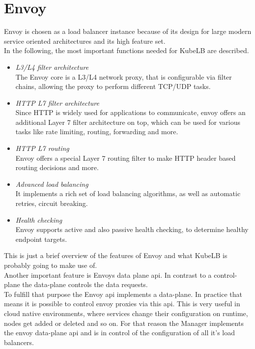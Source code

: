 \section{Envoy}\label{sec:envoy}

Envoy is chosen as a load balancer instance because of its design for large modern service oriented architectures and its high feature set.
\\
In the following, the most important functions needed for KubeLB are described.

\begin{itemize}
    \item \textit{L3/L4 filter architecture} \\
    The Envoy core is a L3/L4 network proxy, that is configurable via filter chains, allowing the proxy to perform different TCP/UDP tasks.
    \item \textit{HTTP L7 filter architecture} \\
    Since HTTP is widely used for applications to communicate, envoy offers an additional Layer 7 filter architecture on top, which can be used for various tasks like rate limiting, routing, forwarding and more.
    \item \textit{HTTP L7 routing} \\
    Envoy offers a special Layer 7 routing filter to make HTTP header based routing decisions and more.
    \item \textit{Advanced load balancing} \\
    It implements a rich set of load balancing algorithms, as well as automatic retries, circuit breaking.
    \item \textit{Health checking} \\
    Envoy supports active and also passive health checking, to determine healthy endpoint targets.
\end{itemize}

This is just a brief overview of the features of Envoy and what KubeLB is probably going to make use of.~\cite{WHAT-IS-ENVOY}
\\
Another important feature is Envoys data plane api.
In contrast to a control-plane the data-plane controls the data requests.
\\
To fulfill that purpose the Envoy api implements a data-plane.
In practice that means it is possible to control envoy proxies via this api.
This is very useful in cloud native environments, where services change their configuration on runtime, nodes get added or deleted and so on.
For that reason the Manager implements the envoy data-plane api and is in control of the configuration of all it's load balancers.
